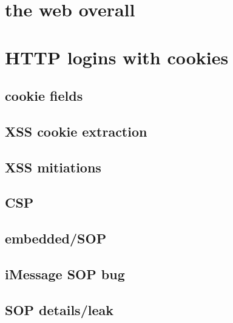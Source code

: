 \date{}
\title{}
\date{}
\usepackage[outputdir=latex.out]{minted}

\begin{frame}
    \titlepage
\end{frame}
\usetikzlibrary{arrows.meta,calc,shapes.callouts,positioning}



\section{the web overall}


%
\section{HTTP logins with cookies}


\subsection{cookie fields}


\subsection{XSS cookie extraction}


\subsection{XSS mitiations}


\subsection{CSP}


\subsection{embedded/SOP}


\subsection{iMessage SOP bug}


\subsection{SOP details/leak}


